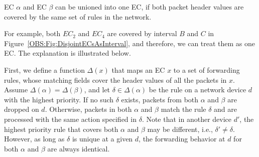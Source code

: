 \begin{lemma}
    EC $\alpha$ and EC $\beta$ can be unioned into one EC, if both packet header values are covered by the same set of rules in the network.
    \label{OBS:Lemma:MergeEC}
\end{lemma}
For example, both $EC_2$ and $EC_4$ are covered by interval $B$ and $C$ in Figure~\ref{OBS:Fig:DisjointECsAsInterval}, and therefore, we can treat them as one EC. The explanation is illustrated below.

First, we define a function $\Delta(x)$ that maps an EC $x$ to a set of forwarding rules, whose matching fields cover the header values of all the packets in $x$. Assume $\Delta(\alpha) = \Delta(\beta)$, and let $\delta \in \Delta(\alpha)$ be the rule on a network device $d$ with the highest priority.
If no such $\delta$ exists, packets from both $\alpha$ and $\beta$ are dropped on $d$.
Otherwise, packets in both $\alpha$ and $\beta$ match the rule $\delta$ and are processed with the same action specified in $\delta$.
Note that in another device $d'$, the highest priority rule that covers both $\alpha$
and $\beta$ may be different, i.e., $\delta' \neq \delta$.
However, as long as $\delta$ is unique at a given $d$, the forwarding behavior at $d$ for both $\alpha$ and $\beta$ are always identical.

